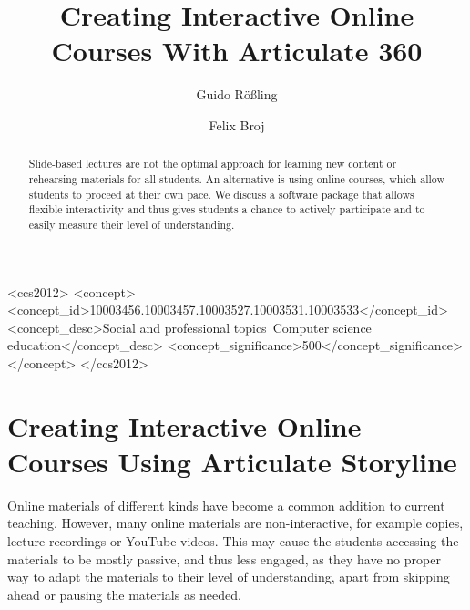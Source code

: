\documentclass[sigconf,anonymous]{acmart}
\begin{document}

\title{Creating Interactive Online Courses With Articulate 360}

\author{Guido R\"o\ss{}ling}
\author{Felix Broj}
\begin{CCSXML}
<ccs2012>
<concept>
<concept_id>10003456.10003457.10003527.10003531.10003533</concept_id>
<concept_desc>Social and professional topics~Computer science education</concept_desc>
<concept_significance>500</concept_significance>
</concept>
</ccs2012>
\end{CCSXML}


\begin{abstract}
Slide-based lectures are not the optimal approach for learning new content or rehearsing materials for
all students. An alternative is using online courses, which allow students to proceed at their own pace.
We discuss a software package that allows flexible interactivity and thus gives students a chance to
actively participate and to easily measure their level of understanding. 
\end{abstract}

\maketitle

\section{Creating Interactive Online Courses Using Articulate Storyline}

Online materials of different kinds have become a common addition to current teaching. However, many
online materials are non-interactive, for example copies, lecture recordings or YouTube
videos. This may cause the students accessing the materials to be mostly passive, and thus less
engaged, as they have no proper way to adapt the materials to their level of understanding,
apart from skipping ahead or pausing the materials as needed.
\end{document}
